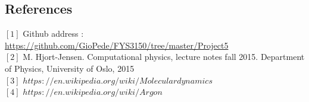 \documentclass[10pt,a4paper,titlepage]{article}
\begin{document}
\subsection*{References}
\noindent $[1]$ Github address : \url {https://github.com/GioPede/FYS3150/tree/master/Project5}
\\ $[2]$ M. Hjort-Jensen. Computational physics, lecture notes fall 2015. Department of Physics, University of Oslo, 2015
\\ $[3]$ $https://en.wikipedia.org/wiki/Moleculardynamics$
\\ $[4]$ $https://en.wikipedia.org/wiki/Argon$
\end{document}
